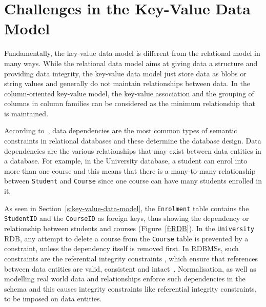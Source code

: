 \section{Challenges in the Key-Value Data Model}\label{s:challenges-key-value}
Fundamentally,   the key-value data model is different from the relational model
in many ways.  While the relational data model aims at giving data a structure
and providing data integrity,   the key-value data model just store data as
\acp{blob} or string values and generally do not maintain relationships between
data.  In the column-oriented key-value model,   the key-value association and
the grouping of columns in column families can be considered as the minimum
relationship that is maintained.

According to~\citet{Bell},   data dependencies are the most common types of
semantic constraints in relational databases and these determine the database
design.  Data dependencies are the various relationships that may exist between
data entities in a database.  For example,   in the University database,   a
student can enrol into more than one course and this means that there is a
many-to-many relationship between \texttt{Student} and \texttt{Course} since  
one course can have many students enrolled in it.

As seen in Section~\ref{s:key-value-data-model},   the \texttt{Enrolment} table
contains the \texttt{StudentID} and the \texttt{CourseID} as foreign keys, thus
showing the dependency or relationship between students and courses
(Figure~\ref{f:RDB}).
In the \texttt{University} \ac{RDB}, any attempt to delete a course from the
\texttt{Course} table is prevented by a constraint,   unless the dependency
itself is removed first.  In \acp{RDBMS},   such constraints are the referential
integrity constraints ,   which ensure that references
between data entities are valid, consistent and intact~\citep{blaha,date}.
Normalisation,   as well as modelling real world data and relationships enforce
such dependencies in the schema and this causes integrity constraints like
referential integrity constraints,   to be imposed on data entities.

